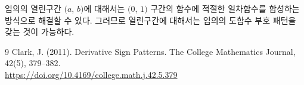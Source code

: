 \documentclass{article}
\begin{document}
임의의 열린구간 $(a$, $b)$에 대해서는 $(0$, $1)$ 구간의 함수에 적절한 일차함수를 합성하는 방식으로 해결할 수 있다. 그러므로 열린구간에 대해서는 임의의 도함수 부호 패턴을 갖는 것이 가능하다.

\begin{thebibliography}{9}
     Clark, J. (2011). Derivative Sign Patterns. The College Mathematics Journal, 42(5), 379–382.\\ \url{https://doi.org/10.4169/college.math.j.42.5.379}
\end{thebibliography}
\end{document}
